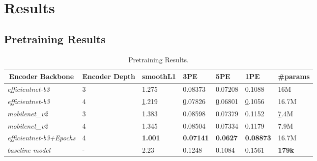 \documentclass[runningheads]{llncs}
\begin{document}
\section{Results}
\subsection{Pretraining Results}
\begin{table}[h!]
\centering
\begin{tabular}{|l|l||l|l|l|l|l|}
\hline
\multicolumn{1}{|c|}{Encoder Backbone} & Encoder Depth & smoothL1       & 3PE              & 5PE             & 1PE              & \#params      \\ \hline\hline
\textit{efficientnet-b3}               & 3             & 1.275          & 0.08373          & 0.07208         & 0.1088           & 16M           \\
\textit{efficientnet-b3}               & 4             & {\ul 1.219}    & {\ul 0.07826}    & {\ul 0.06801}   & {\ul 0.1056}     & 16.7M         \\
\textit{mobilenet\_v2}                 & 3             & 1.383          & 0.08598          & 0.07379         & 0.1152           & {\ul 7.4M}    \\
\textit{mobilenet\_v2}                 & 4             & 1.345          & 0.08504          & 0.07334         & 0.1179           & 7.9M          \\
\textit{efficientnet-b3+Epochs}        & 4             & \textbf{1.001} & \textbf{0.07141} & \textbf{0.0627} & \textbf{0.08873} & 16.7M         \\
\textit{baseline model}                & -             & 2.23           & 0.1248           & 0.1084          & 0.1561           & \textbf{179k} \\ \hline
\end{tabular}
\caption{Pretraining Results.\label{Tab:Pretraining}}
\end{table}
\end{document}
